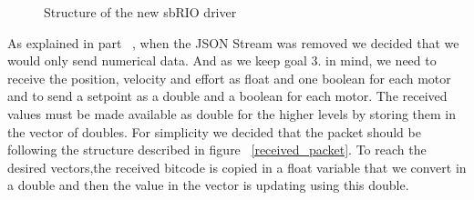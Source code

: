 \begin{figure}
\caption{Structure of the new sbRIO driver}
\label{new_driver}
\end{figure}


As explained in part ~, when the JSON Stream was removed we decided that we would only send numerical data. And as we keep goal 3. in mind, we need to receive the position, velocity and effort as float and one boolean for each motor and to send a setpoint as a double and a boolean for each motor. 
The received values must be made available as double for the higher levels by storing them in the vector of doubles. For simplicity we decided that the packet should be following the structure described in figure ~\ref{received_packet}. To reach the desired vectors,the received bitcode is copied in a float variable that we convert in a double and then the value in the vector is updating using this double.

